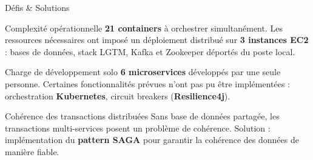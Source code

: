 \documentclass[aspectratio=169]{beamer}
\begin{document}
\begin{frame}{Défis \& Solutions}

  \begin{block}{\faTools\quad Complexité opérationnelle}
    \small \textbf{21 containers} à orchestrer simultanément. Les ressources nécessaires ont
    imposé un déploiement distribué sur \textbf{3 instances EC2} : bases de données, stack
    LGTM, Kafka et Zookeeper déportés du poste local.
  \end{block}

  \vspace{0.4em}

  \begin{block}{\faUserAlt\quad Charge de développement solo}
    \small \textbf{6 microservices} développés par une seule personne. Certaines
    fonctionnalités prévues n'ont pas pu être implémentées : orchestration
    \textbf{Kubernetes}, circuit breakers (\textbf{Resilience4j}).
  \end{block}

  \vspace{0.4em}

  \begin{block}{\faSyncAlt\quad Cohérence des transactions distribuées}
    \small Sans base de données partagée, les transactions multi-services posent un
    problème de cohérence. Solution : implémentation du \textbf{pattern SAGA} pour
    garantir la cohérence des données de manière fiable.
  \end{block}

\end{frame}
\end{document}
